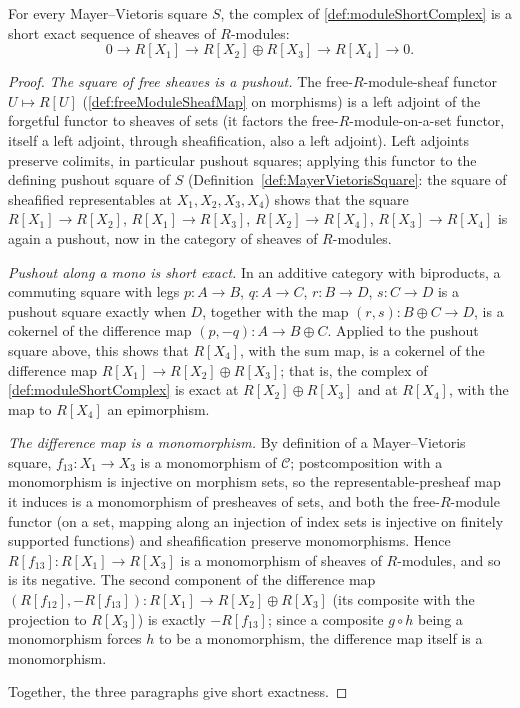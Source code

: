 \begin{theorem}
  \label{thm:moduleShortComplex_shortExact}
  \leanok
  For every Mayer--Vietoris square \(S\), the complex of \ref{def:moduleShortComplex} is a
  short exact sequence of sheaves of \(R\)-modules:
  \[
    0 \to R[X_1] \to R[X_2] \oplus R[X_3] \to R[X_4] \to 0 .
  \]
\end{theorem}
\begin{proof}
  \leanok
  \emph{The square of free sheaves is a pushout.} The free-\(R\)-module-sheaf functor
  \(U \mapsto R[U]\) (\ref{def:freeModuleSheafMap} on morphisms) is a left adjoint of the
  forgetful functor to sheaves of sets (it factors the free-\(R\)-module-on-a-set functor,
  itself a left adjoint, through sheafification, also a left adjoint). Left adjoints
  preserve colimits, in particular pushout squares; applying this functor to the defining
  pushout square of \(S\) (Definition~\ref{def:MayerVietorisSquare}: the square of
  sheafified representables at \(X_1,X_2,X_3,X_4\)) shows that the square
  \(R[X_1] \to R[X_2]\), \(R[X_1] \to R[X_3]\), \(R[X_2] \to R[X_4]\),
  \(R[X_3] \to R[X_4]\) is again a pushout, now in the category of sheaves of
  \(R\)-modules.

  \emph{Pushout along a mono is short exact.} In an additive category with biproducts, a
  commuting square with legs \(p : A \to B\), \(q : A \to C\), \(r : B \to D\),
  \(s : C \to D\) is a pushout square exactly when \(D\), together with the map
  \((r,s) : B \oplus C \to D\), is a cokernel of the difference map
  \((p,-q) : A \to B \oplus C\). Applied to the pushout square above, this shows that
  \(R[X_4]\), with the sum map, is a cokernel of the difference map
  \(R[X_1] \to R[X_2] \oplus R[X_3]\); that is, the complex of \ref{def:moduleShortComplex}
  is exact at \(R[X_2] \oplus R[X_3]\) and at \(R[X_4]\), with the map to \(R[X_4]\) an
  epimorphism.

  \emph{The difference map is a monomorphism.} By definition of a Mayer--Vietoris square,
  \(f_{13} : X_1 \to X_3\) is a monomorphism of \(\mathcal C\); postcomposition with a
  monomorphism is injective on morphism sets, so the representable-presheaf map it induces
  is a monomorphism of presheaves of sets, and both the free-\(R\)-module functor (on a set,
  mapping along an injection of index sets is injective on finitely supported functions) and
  sheafification preserve monomorphisms. Hence \(R[f_{13}] : R[X_1] \to R[X_3]\) is a
  monomorphism of sheaves of \(R\)-modules, and so is its negative. The second component of
  the difference map \((R[f_{12}], -R[f_{13}]) : R[X_1] \to R[X_2] \oplus R[X_3]\) (its
  composite with the projection to \(R[X_3]\)) is exactly \(-R[f_{13}]\); since a composite
  \(g \circ h\) being a monomorphism forces \(h\) to be a monomorphism, the difference map
  itself is a monomorphism.

  Together, the three paragraphs give short exactness.
\end{proof}

